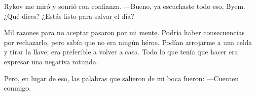 Rykov me miró y sonrió con confianza. —Bueno, ya escuchaste todo eso, Byem. ¿Qué dices? ¿Estás listo para salvar el día?

Mil razones para no aceptar pasaron por mi mente. Podría haber consecuencias por rechazarlo, pero sabía que no era ningún héroe. Podían arrojarme a una celda y tirar la llave; era preferible a volver a casa. Todo lo que tenía que hacer era expresar una negativa rotunda.

Pero, en lugar de eso, las palabras que salieron de mi boca fueron: —Cuenten conmigo.
